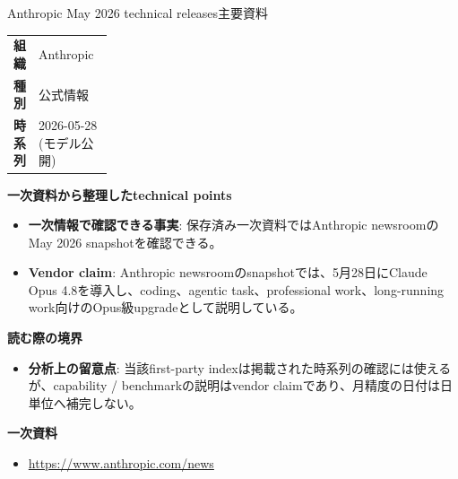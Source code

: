 \begin{technicalnote}{Anthropic May 2026 technical releases}{主要資料}
\begingroup
\begin{tabularx}{\linewidth}{@{}>{\bfseries}p{0.22\linewidth}X@{}}
組織 & Anthropic \\
種別 & 公式情報 \\
時系列 & 2026-05-28 (モデル公開) \\
\end{tabularx}
\smallskip
{\bfseries 一次資料から整理したtechnical points}
\begin{itemize}[leftmargin=1.5em,itemsep=0.35em]
\item \textbf{一次情報で確認できる事実}: 保存済み一次資料ではAnthropic newsroomのMay 2026 snapshotを確認できる。
\item \textbf{Vendor claim}: Anthropic newsroomのsnapshotでは、5月28日にClaude Opus 4.8を導入し、coding、agentic task、professional work、long-running work向けのOpus級upgradeとして説明している。
\end{itemize}
{\bfseries 読む際の境界}
\begin{itemize}[leftmargin=1.5em,itemsep=0.35em]
\item \textbf{分析上の留意点}: 当該first-party indexは掲載された時系列の確認には使えるが、capability / benchmarkの説明はvendor claimであり、月精度の日付は日単位へ補完しない。
\end{itemize}
\begin{samepage}
{\bfseries 一次資料}
\begingroup\sloppy
\begin{itemize}[leftmargin=1.5em,itemsep=0.25em]
\item {\scriptsize\url{https://www.anthropic.com/news}}
\end{itemize}
\endgroup
\end{samepage}
\endgroup
\end{technicalnote}
\medskip

